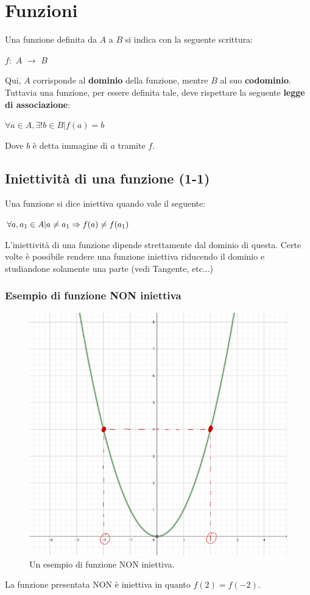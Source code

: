 \documentclass[12pt]{article}
\begin{document}
\section{Funzioni}
Una funzione definita da $A$ a $B$ si indica con la seguente scrittura:
\begin{center}
    $f:$ $A$ $\rightarrow$ $B$
\end{center}
Qui, $A$ corrisponde al \textbf{dominio} della funzione, mentre $B$ al suo \textbf{codominio}.
Tuttavia una funzione, per essere definita tale, deve rispettare la seguente \textbf{legge di associazione}:
\begin{center}
    $\forall a \in A, \exists! b \in B | f(a) = b$
\end{center}
Dove $b$ è detta immagine di $a$ tramite $f$.
\pagebreak
\subsection{Iniettività di una funzione (1-1)}
Una funzione si dice iniettiva quando vale il seguente:
\begin{center}
    $\forall a, a\textsubscript{1} \in A | a \not= a\textsubscript{1} \Rightarrow f(a) \not= f(a\textsubscript{1})$
\end{center}
L'iniettività di una funzione dipende strettamente dal dominio di questa. Certe volte è possibile rendere una funzione iniettiva riducendo il dominio e studiandone solamente una parte (vedi Tangente, etc...)
\subsubsection{Esempio di funzione NON iniettiva}
\begin{figure}[!htb]
    \centering
    \includegraphics[width=.9\linewidth,height=.40\textheight,keepaspectratio]{lezione_1/iniet_func.png} %
    \begin{center}
        \caption{\label{fig:no_iniett_example}Un esempio di funzione NON iniettiva.} %
    \end{center}
\end{figure}
La funzione presentata NON è iniettiva in quanto $f(2) = f(-2)$.
\pagebreak
\end{document}
